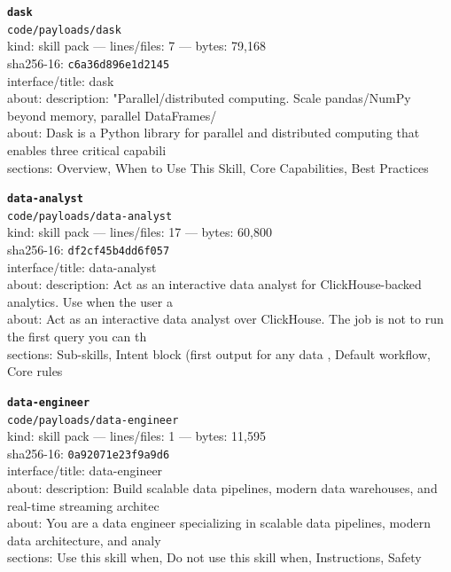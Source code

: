 \noindent\textbf{\texttt{dask}}\\
\texttt{code/payloads/dask}\\
kind: skill pack --- lines/files: 7 --- bytes: 79,168\\
sha256-16: \texttt{c6a36d896e1d2145}\\
interface/title: dask\\
about: description: "Parallel/distributed computing. Scale pandas/NumPy beyond memory, parallel DataFrames/\\
about: Dask is a Python library for parallel and distributed computing that enables three critical capabili\\
sections: Overview, When to Use This Skill, Core Capabilities, Best Practices\\
\vspace*{6.0pt}
\newpage

\noindent\textbf{\texttt{data-analyst}}\\
\texttt{code/payloads/data-analyst}\\
kind: skill pack --- lines/files: 17 --- bytes: 60,800\\
sha256-16: \texttt{df2cf45b4dd6f057}\\
interface/title: data-analyst\\
about: description: Act as an interactive data analyst for ClickHouse-backed analytics. Use when the user a\\
about: Act as an interactive data analyst over ClickHouse. The job is not to run the first query you can th\\
sections: Sub-skills, Intent block (first output for any data , Default workflow, Core rules\\
\vspace*{6.0pt}

\noindent\textbf{\texttt{data-engineer}}\\
\texttt{code/payloads/data-engineer}\\
kind: skill pack --- lines/files: 1 --- bytes: 11,595\\
sha256-16: \texttt{0a92071e23f9a9d6}\\
interface/title: data-engineer\\
about: description: Build scalable data pipelines, modern data warehouses, and real-time streaming architec\\
about: You are a data engineer specializing in scalable data pipelines, modern data architecture, and analy\\
sections: Use this skill when, Do not use this skill when, Instructions, Safety\\
\vspace*{6.0pt}

